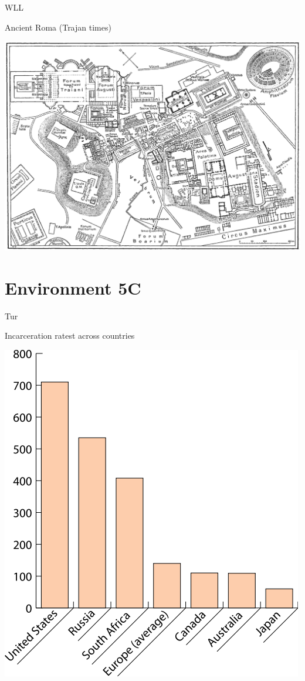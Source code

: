 \begin{map}{W}{LL}
\caption{Ancient Roma  (Trajan times)}
\label{map:roma}
\includegraphics[width=\chartwidth,height=\chartheight]{Rome}
\end{map}


\section{Environment 5C}



\begin{map}{T}{ur}
\caption{Incarceration ratest across countries}
\label{chart:incarceration}
\includegraphics[width=\chartwidth,height=\chartheight]{incarceration}  
\end{map}

